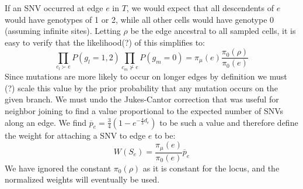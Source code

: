 \documentclass[../../main.tex]{subfiles}
\begin{document}
If an SNV occurred at edge $e$ in $T$, we would expect that all descendents of $e$ would have genotypes of 1 or 2, while all other cells would have genotype 0 (assuming infinite sites).
Letting $\rho$ be the edge ancestral to all sampled cells, it is easy to verify that the likelihood(?) of this simplifies to:
\begin{equation}
    \prod_{c_l\succ e}P(g_l =1,2)\prod_{c_m\nsucc e} P(g_m = 0) = \pi_\mu(e)\frac{\pi_0(\rho)}{\pi_0(e)}
\end{equation}
Since mutations are more likely to occur on longer edges by definition we must (?) scale this value by the prior probability that any mutation occurs on the given branch.
We must undo the Jukes-Cantor correction that was useful for neighbor joining to find a value proportional to the expected number of SNVs along an edge.
We find $\overline{p}_e = \frac{3}{4}\left(1-e^{-\frac{4}{3}d_e}\right)$ to be such a value and therefore define the weight for attaching a SNV to edge $e$ to be:
\begin{equation}
    W(S_e) = \frac{\pi_\mu(e)}{\pi_0(e)} \overline{p}_e
\end{equation}
We have ignored the constant $\pi_0(\rho)$ as it is constant for the locus, and the normalized weights will eventually be used.
\end{document}

